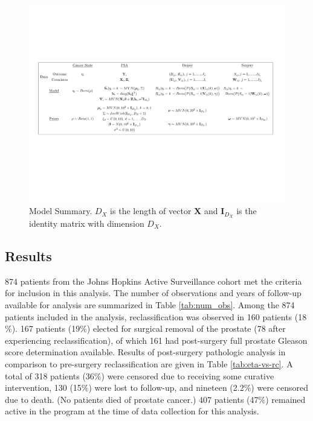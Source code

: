 \documentclass[12pt, letterpaper]{article}
\newcommand{\bmX}{\mathbf{X}}
\newcommand{\bmI}{\mathbf{I}}
\begin{document}
\begin{figure}
\begin{center}
\includegraphics[width=\textwidth]{model-summary-table.pdf}
\caption{Model Summary. $D_X$ is the length of vector $\bmX$ and $\bmI_{D_X}$ is the identity matrix with dimension $D_X$.}
\label{fig:model-summary}
\end{center}
\end{figure}



\subsection{Results}
874 patients from the Johns Hopkins Active Surveillance cohort met the criteria for inclusion in this analysis. The number of observations and years of follow-up available for analysis are summarized in Table \ref{tab:num_obs}. Among the 874 patients included in the analysis, reclassification was observed in 160 patients (18$\%$). 167 patients (19$\%$) elected for surgical removal of the prostate (78 after experiencing reclassification), of which 161 had post-surgery full prostate Gleason score determination available. Results of post-surgery pathologic analysis in comparison to pre-surgery reclassification are given in Table \ref{tab:eta-vs-rc}. A total of 318 patients (36$\%$) were censored due to receiving some curative intervention, 130 (15$\%$) were lost to follow-up, and nineteen (2.2$\%$) were censored due to death. (No patients died of prostate cancer.) 407 patients (47$\%$) remained active in the program at the time of data collection for this analysis. 
\end{document}
